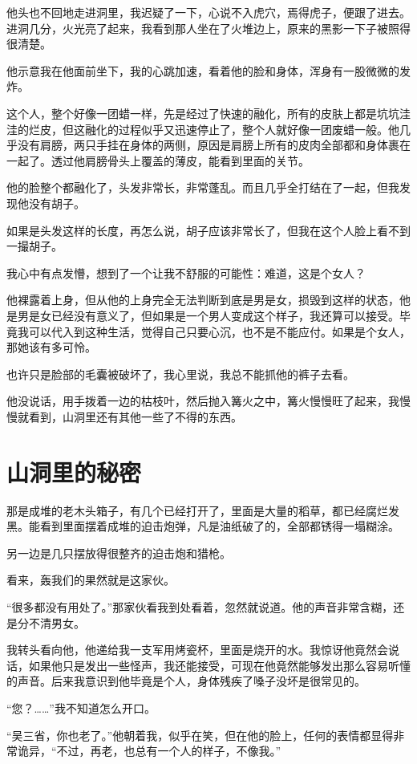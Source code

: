 他头也不回地走进洞里，我迟疑了一下，心说不入虎穴，焉得虎子，便跟了进去。进洞几分，火光亮了起来，我看到那人坐在了火堆边上，原来的黑影一下子被照得很清楚。

他示意我在他面前坐下，我的心跳加速，看着他的脸和身体，浑身有一股微微的发炸。

这个人，整个好像一团蜡一样，先是经过了快速的融化，所有的皮肤上都是坑坑洼洼的烂皮，但这融化的过程似乎又迅速停止了，整个人就好像一团废蜡一般。他几乎没有肩膀，两只手挂在身体的两侧，原因是肩膀上所有的皮肉全部都和身体裹在一起了。透过他肩膀骨头上覆盖的薄皮，能看到里面的关节。

他的脸整个都融化了，头发非常长，非常蓬乱。而且几乎全打结在了一起，但我发现他没有胡子。

如果是头发这样的长度，再怎么说，胡子应该非常长了，但我在这个人脸上看不到一撮胡子。

我心中有点发懵，想到了一个让我不舒服的可能性：难道，这是个女人？

他裸露着上身，但从他的上身完全无法判断到底是男是女，损毁到这样的状态，他是男是女已经没有意义了，但如果是一个男人变成这个样子，我还算可以接受。毕竟我可以代入到这种生活，觉得自己只要心沉，也不是不能应付。如果是个女人，那她该有多可怜。

也许只是脸部的毛囊被破坏了，我心里说，我总不能抓他的裤子去看。

他没说话，用手拨着一边的枯枝叶，然后抛入篝火之中，篝火慢慢旺了起来，我慢慢就看到，山洞里还有其他一些了不得的东西。

\chapter{山洞里的秘密}

那是成堆的老木头箱子，有几个已经打开了，里面是大量的稻草，都已经腐烂发黑。能看到里面摆着成堆的迫击炮弹，凡是油纸破了的，全部都锈得一塌糊涂。

另一边是几只摆放得很整齐的迫击炮和猎枪。

看来，轰我们的果然就是这家伙。

“很多都没有用处了。”那家伙看我到处看着，忽然就说道。他的声音非常含糊，还是分不清男女。

我转头看向他，他递给我一支军用烤瓷杯，里面是烧开的水。我惊讶他竟然会说话，如果他只是发出一些怪声，我还能接受，可现在他竟然能够发出那么容易听懂的声音。后来我意识到他毕竟是个人，身体残疾了嗓子没坏是很常见的。

“您？……”我不知道怎么开口。

“吴三省，你也老了。”他朝着我，似乎在笑，但在他的脸上，任何的表情都显得非常诡异，“不过，再老，也总有一个人的样子，不像我。”

